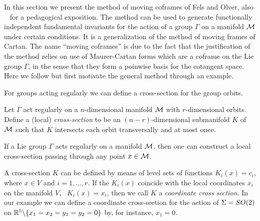 In this section we present the method of moving coframes
of Fels and Olver, also \cf~ for
a pedagogical exposition. The method can be used to generate functionally independent fundamental invariants for the action of a group $\Gamma$ on a manifold $\mathcal{M}$ under certain conditions. 
It is a generalization of the method of moving frames of Cartan. The name ``moving coframes'' is due to
the fact that the justification of the method relies on use of Maurer-Cartan forms which are a coframe on
the Lie group $\Gamma$, in the sense that they form a poinwise basis for the cotangent space.
Here we follow  but first motivate the general method through an example.

For groups acting regularly we can define a cross-section for the group orbits.

\begin{definition}
\label{def:cross-section}
Let $\Gamma$ act regularly on a $n$-dimensional manifold $\mathcal{M}$ with $r$-dimensional orbits. Define a (local) \emph{cross-section}
to be an $(n-r)$-dimensional submanifold $K$ of $\mathcal{M}$ such that $K$ intersects each orbit transversally and at most once.
\end{definition}


\begin{proposition}
 If a Lie group $\Gamma$ acts regularly on a manifold $\mathcal{M}$, then one can construct a local cross-section
 passing through any point $x\in \mathcal{M}$.
\end{proposition}

A cross-section $K$ can be defined by means of level sets of functions $K_i(x)=c_i$,
where $x\in V$ and $i=1,\ldots,r$. If the $K_i(x)$
coincide with the local coordinates $x_i$ on the manifold $V$, \ie~$K_i(x)=x_i$,
then we call $K$ a \emph{coordinate cross
section}. In our example we can define a coordinate cross-section for the action of
$\Sigma=SO(2)$ on $\mathbb{R}^{5}\backslash\{x_1=x_2=y_1=y_2=0\}$  by, for instance, $x_1=0$.

